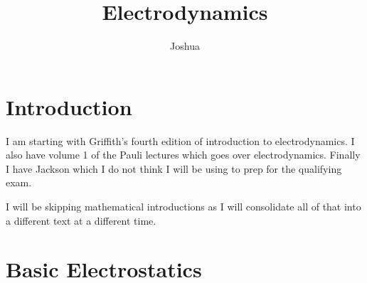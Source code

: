 \documentclass[preprint, review,12pt]{elsarticle}
\begin{document}
\begin{frontmatter}



\title{Electrodynamics}


\author{Joshua}



\end{frontmatter}



\section{Introduction}

I am starting with Griffith's fourth edition of introduction to electrodynamics. I also have volume 1 of the Pauli lectures which goes over electrodynamics. Finally I have Jackson which I do not think I will be using to prep for the qualifying exam. \cite{GriffithsEM} \cite{PauliEM} \cite{Jackson}

I will be skipping mathematical introductions as I will consolidate all of that into a different text at a different time.

\section{Basic Electrostatics}
\end{document}
